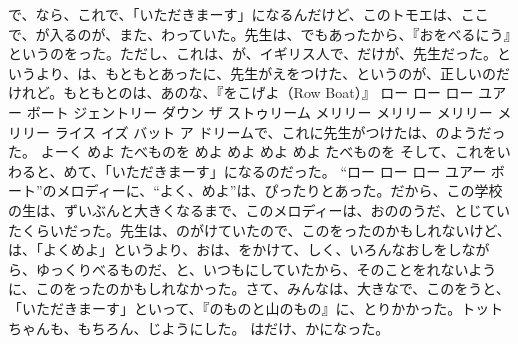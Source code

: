 で、なら、これで、「いただきまーす」になるんだけど、このトモエは、ここで、が入るのが、また、わっていた。先生は、でもあったから、『おをべるにう』というのをった。ただし、これは、が、イギリス人で、だけが、先生だった。というより、は、もともとあったに、先生がえをつけた、というのが、正しいのだけれど。もともとのは、あのな、『をこげよ（Row Boat）』 ロー ロー ロー ユアー ボート ジェントリー ダウン ザ ストゥリーム メリリー メリリー メリリー メリリー ライス イズ バット ア ドリームで、これに先生がつけたは、のようだった。 よーく めよ たべものを めよ  めよ  めよ  めよ たべものを そして、これをいわると、めて、「いただきまーす」になるのだった。 “ロー ロー ロー ユアー ボート”のメロディーに、“よく、めよ”は、ぴったりとあった。だから、この学校の生は、ずいぶんと大きくなるまで、このメロディーは、おののうだ、とじていたくらいだった。先生は、のがけていたので、このをったのかもしれないけど、は、「よくめよ」というより、おは、をかけて、しく、いろんなおしをしながら、ゆっくりべるものだ、と、いつもにしていたから、そのことをれないように、このをったのかもしれなかった。さて、みんなは、大きなで、このをうと、「いただきまーす」といって、『のものと山のもの』に、とりかかった。トットちゃんも、もちろん、じようにした。 はだけ、かになった。


